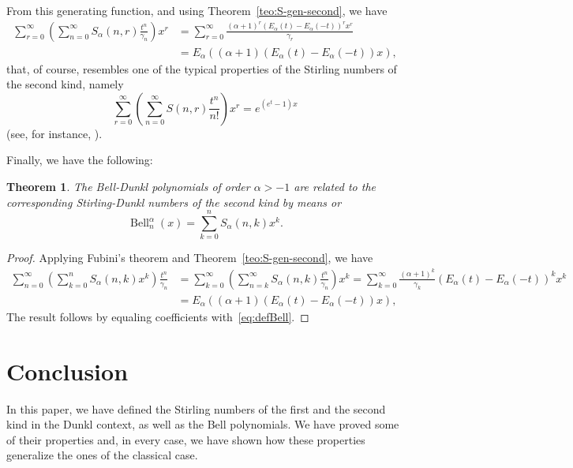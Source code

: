 \documentclass[11pt,a4paper]{article}
\theoremstyle{plain}
\newtheorem{theorem}{Theorem}[section]
\theoremstyle{remark}
\newcommand{\Ea}{E_{\alpha}}
\newcommand{\Bell}{\operatorname{Bell}}
\begin{document}
From this generating function, and using Theorem~\ref{teo:S-gen-second}, we have  
\begin{align*}
  \sum_{r=0}^{\infty} \left( \sum_{n=0}^{\infty} S_{\alpha}(n,r) \frac{t^n}{\gamma_n} \right) x^r 
  &= \sum_{r=0}^{\infty} \frac{(\alpha+1)^r(\Ea(t)-\Ea(-t))^rx^r}{\gamma_r} \\
  &= \Ea((\alpha+1)(\Ea(t)-\Ea(-t))x),
\end{align*}
that, of course, resembles one of the typical properties of the Stirling numbers of the second kind, namely
\[
  \sum_{r=0}^{\infty} \left( \sum_{n=0}^{\infty} S(n,r) \frac{t^n}{n!} \right) x^r
  = e^{(e^t-1)x}
\]
(see, for instance, \cite[26.8.13]{Br-NIST}).

Finally, we have the following:

\begin{theorem}
The Bell-Dunkl polynomials of order $\alpha>-1$ are related to the corresponding Stirling-Dunkl numbers of the second kind by means or
\[
  \Bell_n^\alpha(x) = \sum_{k=0}^n S_\alpha(n,k) x^k.
\]
\end{theorem}

\begin{proof}
Applying Fubini's theorem and Theorem~\ref{teo:S-gen-second}, we have
\begin{align*}
  \sum_{n=0}^{\infty} \left( \sum_{k=0}^{n} S_{\alpha}(n,k) x^k \right) \frac{t^n}{\gamma_n} 
  &= \sum_{k=0}^{\infty} \left( \sum_{n=k}^{\infty} S_{\alpha}(n,k) \frac{t^n}{\gamma_n}  \right) x^k 
  = \sum_{k=0}^{\infty} \frac{(\alpha+1)^k}{\gamma_k} (\Ea(t)-\Ea(-t))^k x^k \\
  &= \Ea((\alpha+1)(\Ea(t)-\Ea(-t))x),
\end{align*}
The result follows by equaling coefficients with~\eqref{eq:defBell}.
\end{proof}

\section{Conclusion}

In this paper, we have defined the Stirling numbers of the first and the second kind in the Dunkl context, as well as the Bell polynomials. We have proved some of their properties and, in every case, we have shown how these properties generalize the ones of the classical case. 
\end{document}
